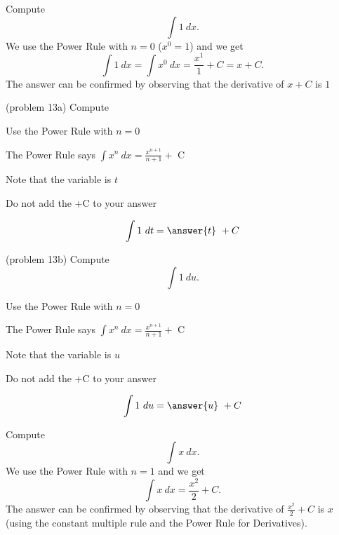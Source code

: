\documentclass[handout]{ximera}
\begin{document}
\begin{example}[example 13]
Compute $$\int 1 \ dx.$$
We use the Power Rule with $n= 0$  ($x^0 = 1$) and we get
\[\int 1 \ dx = \int x^0 \ dx =\frac{x^1}{1} + C = x+C.\] The answer can be confirmed by observing that the 
derivative of $x + C$ is $1$ 
\end{example}

\begin{problem}(problem 13a)
Compute 


\begin{hint}
Use the Power Rule with $n=0$
\end{hint}
\begin{hint}
The Power Rule says $\int x^n \ dx = \frac{x^{n+1}}{n+1} +$ C
\end{hint}
\begin{hint}
Note that the variable is $t$
\end{hint}
\begin{hint}
\begin{center}
Do not add the +C to your answer
\end{center}
\end{hint}

\[
\int 1 \ dt =
\answer{t} \ + C
\]
\end{problem}


\begin{problem}(problem 13b)
Compute 
\[
\int 1 \ du.
\]


\begin{hint}
Use the Power Rule with $n=0$
\end{hint}
\begin{hint}
The Power Rule says $\int x^n \ dx = \frac{x^{n+1}}{n+1} +$ C
\end{hint}
\begin{hint}
Note that the variable is $u$
\end{hint}
\begin{hint}
\begin{center}
Do not add the +C to your answer
\end{center}
\end{hint}

\[
\int 1 \ du =
\answer{u} \ + C
\]
\end{problem}


\begin{example}[example 14]
Compute $$\int x \ dx.$$
We use the Power Rule with $n= 1$ and we get
\[\int x \ dx = \frac{x^2}{2} + C.\] The answer can be confirmed by observing that the 
derivative of $\frac{x^2}{2} +C$ is $x$ (using the constant multiple rule and the Power Rule for Derivatives).
\end{example}
\end{document}
